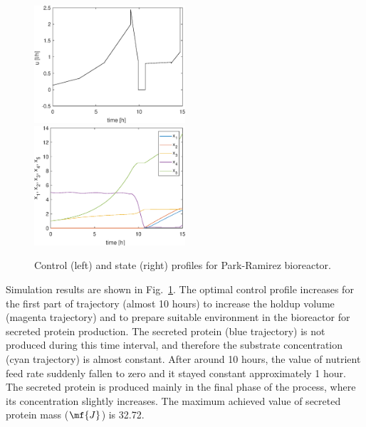 \begin{figure}[htb]
	\includegraphics[width=0.5\textwidth]{examples/problem_pr_bior/graphs/u.eps}
	\includegraphics[width=0.5\textwidth]{examples/problem_pr_bior/graphs/x.eps}
	\caption{Control (left) and state (right) profiles for Park-Ramirez bioreactor.} \label{fig:prob_pr_bior}
\end{figure}

Simulation results are shown in Fig.~\ref{fig:prob_pr_bior}. The optimal control profile increases for the first part of trajectory (almost 10 hours) to increase the holdup volume (magenta trajectory) and to prepare suitable environment in the bioreactor for secreted protein production. The secreted protein (blue trajectory) is not produced during this time interval, and therefore the substrate concentration (cyan trajectory) is almost constant. After around 10 hours, the value of nutrient feed rate suddenly fallen to zero and it stayed constant approximately 1 hour. The secreted protein is produced mainly in the final phase of the process, where its concentration slightly increases. The maximum achieved value of secreted protein mass ($\mf{J}$) is 32.72.

